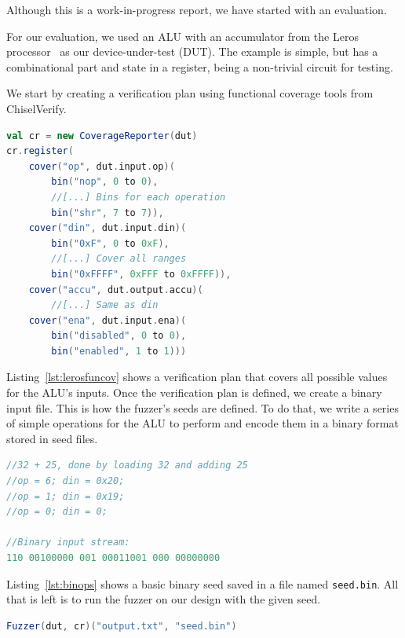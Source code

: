 \documentclass[conference]{IEEEtran}
\begin{document}
Although this is a work-in-progress report, we have started with an evaluation.

For our evaluation, we used an ALU with an accumulator from the Leros processor~\cite{leros:arcs2019}
as our device-under-test (DUT).
The example is simple, but has a combinational part and state in a register, being
a non-trivial circuit for testing.

We start by creating a verification plan using functional coverage tools from ChiselVerify.
\begin{lstlisting}[captionpos=b,caption={Simple verification plan for the Leros ALU. Since this is still a work-in-progress, the verification plan is simple and only contains basic cover points. The functional coverage code is also abridged since it is not our main focus in this paper.},label={lst:lerosfuncov},language=scala]
val cr = new CoverageReporter(dut)
cr.register(
    cover("op", dut.input.op)(
        bin("nop", 0 to 0),
        //[...] Bins for each operation
        bin("shr", 7 to 7)),
    cover("din", dut.input.din)(
        bin("0xF", 0 to 0xF),
        //[...] Cover all ranges
        bin("0xFFFF", 0xFFF to 0xFFFF)),
    cover("accu", dut.output.accu)(
        //[...] Same as din
    cover("ena", dut.input.ena)(
        bin("disabled", 0 to 0),
        bin("enabled", 1 to 1)))
\end{lstlisting}
Listing~\ref{lst:lerosfuncov} shows a verification plan that covers all possible values for the ALU's inputs.
Once the verification plan is defined, we create a binary input file.
This is how the fuzzer's seeds are defined.
To do that, we write a series of simple operations for the ALU to perform and encode them in a binary format stored in seed files.
\begin{lstlisting}[captionpos=b,caption={Basic ALU operations; dut.io.op is 3 bits wide and din is 8 bits wide. Each binary input in the example is separated with a whitespace for clarity.},label={lst:binops},language=C]
//32 + 25, done by loading 32 and adding 25 
//op = 6; din = 0x20; 
//op = 1; din = 0x19;
//op = 0; din = 0;

//Binary input stream:
110 00100000 001 00011001 000 00000000
\end{lstlisting}
Listing~\ref{lst:binops} shows a basic binary seed saved in a file named \texttt{seed.bin}.
All that is left is to run the fuzzer on our design with the given seed.
\begin{lstlisting}[captionpos=b,caption={Call to the fuzzer using the setup previously described.},label={lst:fuzzcall},language=scala]
Fuzzer(dut, cr)("output.txt", "seed.bin")
\end{lstlisting}
\end{document}
